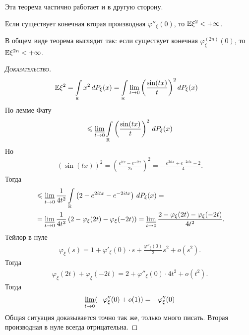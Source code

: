 \documentclass[../main.tex]{subfiles}
\begin{document}
Эта теорема частично работает и в другую сторону.

\begin{thm}
 Если существует конечная вторая производная $ \varphi''_\xi(0) $, то $ \mathbb E\xi^{2} < +\infty $.
\end{thm}
\begin{remrk*}
 В общем виде теорема выглядит так: если существует конечная $ \varphi^{(2n)}_\xi(0) $, то $ \mathbb E\xi^{2n} < +\infty $.
\end{remrk*}
\begin{proof}[\normalfont\textsc{Доказательство}]
 \begin{align*}
  \mathbb E\xi^{2} &= \int\limits_{\mathbb{R}} x^{2}\,dP_\xi(x) = \int\limits_{\mathbb{R}} \lim_{t \to 0} \left(\frac{\sin(tx)}{t} \right)  ^{2}dP_\xi(x)
 \end{align*} По лемме Фату
 \begin{align*}
  \leqslant \varliminf_{t \to 0} \int\limits_{\mathbb{R}} \left( \frac{\sin(tx)}{t} \right)^{2}\,dP_\xi(x)
 \end{align*} Но
 \begin{align*}
  (\sin(tx))^{2} = \left( \frac{e^{itx} - e^{-itx}}{2i} \right)^{2} = -\frac{e^{2itx} + e^{-2itx}-2}{4}.
 \end{align*} Тогда
 \begin{align*}
  &\leqslant \varliminf_{t \to 0} \frac{1}{4t^{2}} \int\limits_{\mathbb{R}} \left( 2-e^{2itx} -e^{-2itx} \right) \,dP_\xi(x) = \\
  &= \varliminf_{t\to 0} \frac{1}{4t^{2}} \left( 2 - \varphi_\xi(2t) - \varphi_\xi(-2t) \right) = \varliminf_{ t\to 0} \frac{2  - \varphi_\xi(2t) - \varphi_\xi(-2t)}{4t^{2}}.
 \end{align*}
 Тейлор в нуле
 \begin{align*}
  \varphi_\xi(s) = 1 + \varphi'_\xi(0) \cdot s + \frac{\varphi''_\xi(0)}{2}s^{2} + o(s^{2}).
 \end{align*} Тогда
 \begin{align*}
  \varphi_\xi(2t) + \varphi_\xi(-2t) = 2 + \varphi''_\xi(0) \cdot 4t^{2} + o(t^{2}).
 \end{align*}
 Тогда
 \begin{align*}
  \varliminf_{t \to 0} (-\varphi''_\xi(0) + o(1)) = -\varphi''_\xi(0)
 \end{align*} Общая ситуация доказывается точно так же, только много писать. Вторая производная в нуле всегда отрицательна.
\end{proof}
\end{document}
